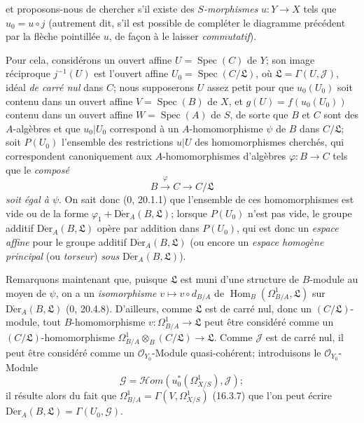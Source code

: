 et proposons-nous de chercher s'il existe des \emph{$S$-morphismes}
$u:Y\to X$ tels que $u_0=u\circ j$ (autrement dit, s'il est possible de
compléter le diagramme précédent par la flèche pointillée $u$, de façon à le
laisser \emph{commutatif}).

Pour cela, considérons un ouvert affine $U=\operatorname{Spec}(C)$ de $Y$;
son image réciproque $j^{-1}(U)$ est l'ouvert affine
$U_0=\operatorname{Spec}(C/\mathfrak{L})$, où
$\mathfrak{L}=\Gamma(U,\mathscr{J})$, idéal \emph{de carré nul} dans $C$;
nous supposerons $U$ assez petit pour que $u_0(U_0)$ soit contenu dans un
ouvert affine $V=\operatorname{Spec}(B)$ de $X$, et
$g(U)=f(u_0(U_0))$ contenu dans un ouvert affine
$W=\operatorname{Spec}(A)$ de $S$, de sorte que $B$ et $C$ sont des
$A$-algèbres et que $u_0|U_0$ correspond à un $A$-homomorphisme $\psi$ de
$B$ dans $C/\mathfrak{L}$; soit $P(U_0)$ l'ensemble des restrictions $u|U$
des homomorphismes cherchés, qui correspondent canoniquement aux
$A$-homomorphismes d'algèbres $\varphi:B\to C$ tels que le \emph{composé}
\[
  B\xrightarrow{\varphi}C\longrightarrow C/\mathfrak{L}
\]
\emph{soit égal à $\psi$}. On sait donc (0, 20.1.1) que l'ensemble de ces
homomorphismes est vide ou de la forme
$\varphi_1+\operatorname{D\acute{e}r}_A(B,\mathfrak{L})$; lorsque $P(U_0)$ n'est pas
vide, le groupe additif $\operatorname{D\acute{e}r}_A(B,\mathfrak{L})$ opère par
addition dans $P(U_0)$, qui est donc un \emph{espace affine} pour le groupe
additif $\operatorname{D\acute{e}r}_A(B,\mathfrak{L})$ (ou encore un
\emph{espace homogène principal} (ou \emph{torseur}) \emph{sous}
$\operatorname{D\acute{e}r}_A(B,\mathfrak{L})$).

Remarquons maintenant que, puisque $\mathfrak{L}$ est muni d'une structure de
$B$-module au moyen de $\psi$, on a un \emph{isomorphisme}
$v\mapsto v\circ d_{B/A}$ de
$\operatorname{Hom}_B(\Omega_{B/A}^1,\mathfrak{L})$ sur
$\operatorname{D\acute{e}r}_A(B,\mathfrak{L})$ (0, 20.4.8). D'ailleurs, comme
$\mathfrak{L}$ est de carré nul, donc un $(C/\mathfrak{L})$-module, tout
$B$-homomorphisme $v:\Omega_{B/A}^1\to\mathfrak{L}$ peut être considéré
comme un $(C/\mathfrak{L})$-homomorphisme
$\Omega_{B/A}^1\otimes_B(C/\mathfrak{L})\to\mathfrak{L}$. Comme
$\mathscr{J}$ est de carré nul, il peut être considéré comme un
$\mathcal{O}_{Y_0}$-Module quasi-cohérent; introduisons le
$\mathcal{O}_{Y_0}$-Module
\[
  \mathscr{G}=\mathscr{H}om(u_0^*(\Omega_{X/S}^1),\mathscr{J});
  \tag{16.5.14.2}
  \label{IV.16.5.14.2}
\]
il résulte alors du fait que
$\Omega_{B/A}^1=\Gamma(V,\Omega_{X/S}^1)$ (16.3.7) que l'on peut écrire
$\operatorname{D\acute{e}r}_A(B,\mathfrak{L})=\Gamma(U_0,\mathscr{G})$.

